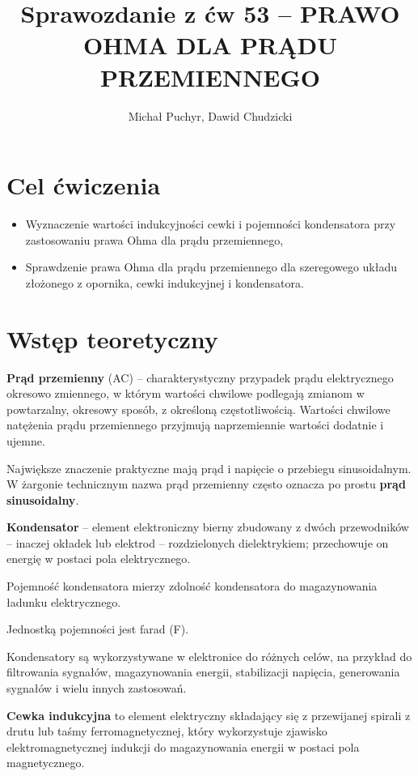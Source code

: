 \documentclass[12pt]{article}
\author{Michał Puchyr, Dawid Chudzicki}
\title{Sprawozdanie z ćw 53 -- PRAWO OHMA DLA PRĄDU PRZEMIENNEGO}
\begin{document}
\maketitle

\section{Cel ćwiczenia}
\begin{itemize}
    \item Wyznaczenie wartości indukcyjności cewki i pojemności kondensatora przy zastosowaniu prawa
    Ohma dla prądu przemiennego,
    \item Sprawdzenie prawa Ohma dla prądu przemiennego dla
    szeregowego układu złożonego z opornika, cewki indukcyjnej i kondensatora.
\end{itemize}

\section{Wstęp teoretyczny}

\textbf{Prąd przemienny} (AC) -- charakterystyczny przypadek prądu elektrycznego okresowo zmiennego, 
w którym wartości chwilowe podlegają zmianom w powtarzalny, okresowy sposób, z określoną częstotliwością. 
Wartości chwilowe natężenia prądu przemiennego przyjmują naprzemiennie wartości dodatnie i ujemne. 

Największe znaczenie praktyczne mają prąd i napięcie o przebiegu sinusoidalnym. W żargonie technicznym nazwa prąd przemienny często oznacza po prostu \textbf{prąd sinusoidalny}. \bigskip

\textbf{Kondensator} -- element elektroniczny bierny zbudowany z dwóch przewodników -- inaczej okładek lub elektrod -- 
rozdzielonych dielektrykiem; przechowuje on energię w postaci pola elektrycznego.

Pojemność kondensatora mierzy zdolność kondensatora do magazynowania ładunku elektrycznego.

Jednostką pojemności jest farad (F). 

Kondensatory są wykorzystywane w elektronice do różnych celów, na przykład do filtrowania sygnałów, 
magazynowania energii, stabilizacji napięcia, generowania sygnałów i wielu innych zastosowań. \bigskip

\textbf{Cewka indukcyjna} to element elektryczny składający się z przewijanej spirali z drutu lub taśmy ferromagnetycznej, 
który wykorzystuje zjawisko elektromagnetycznej indukcji do magazynowania energii w postaci pola magnetycznego. 
\end{document}
